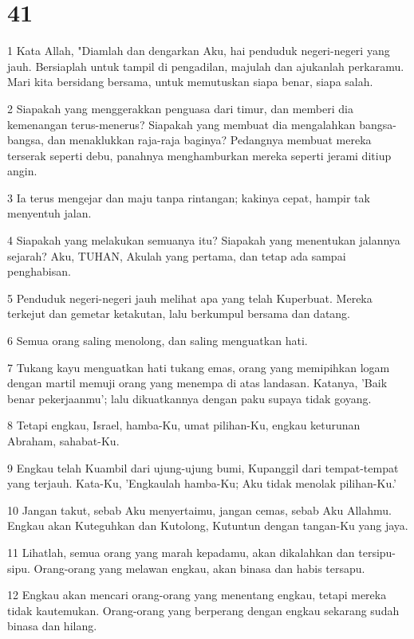 \chapter{41}

\par 1 Kata Allah, "Diamlah dan dengarkan Aku, hai penduduk negeri-negeri yang jauh. Bersiaplah untuk tampil di pengadilan, majulah dan ajukanlah perkaramu. Mari kita bersidang bersama, untuk memutuskan siapa benar, siapa salah.
\par 2 Siapakah yang menggerakkan penguasa dari timur, dan memberi dia kemenangan terus-menerus? Siapakah yang membuat dia mengalahkan bangsa-bangsa, dan menaklukkan raja-raja baginya? Pedangnya membuat mereka terserak seperti debu, panahnya menghamburkan mereka seperti jerami ditiup angin.
\par 3 Ia terus mengejar dan maju tanpa rintangan; kakinya cepat, hampir tak menyentuh jalan.
\par 4 Siapakah yang melakukan semuanya itu? Siapakah yang menentukan jalannya sejarah? Aku, TUHAN, Akulah yang pertama, dan tetap ada sampai penghabisan.
\par 5 Penduduk negeri-negeri jauh melihat apa yang telah Kuperbuat. Mereka terkejut dan gemetar ketakutan, lalu berkumpul bersama dan datang.
\par 6 Semua orang saling menolong, dan saling menguatkan hati.
\par 7 Tukang kayu menguatkan hati tukang emas, orang yang memipihkan logam dengan martil memuji orang yang menempa di atas landasan. Katanya, 'Baik benar pekerjaanmu'; lalu dikuatkannya dengan paku supaya tidak goyang.
\par 8 Tetapi engkau, Israel, hamba-Ku, umat pilihan-Ku, engkau keturunan Abraham, sahabat-Ku.
\par 9 Engkau telah Kuambil dari ujung-ujung bumi, Kupanggil dari tempat-tempat yang terjauh. Kata-Ku, 'Engkaulah hamba-Ku; Aku tidak menolak pilihan-Ku.'
\par 10 Jangan takut, sebab Aku menyertaimu, jangan cemas, sebab Aku Allahmu. Engkau akan Kuteguhkan dan Kutolong, Kutuntun dengan tangan-Ku yang jaya.
\par 11 Lihatlah, semua orang yang marah kepadamu, akan dikalahkan dan tersipu-sipu. Orang-orang yang melawan engkau, akan binasa dan habis tersapu.
\par 12 Engkau akan mencari orang-orang yang menentang engkau, tetapi mereka tidak kautemukan. Orang-orang yang berperang dengan engkau sekarang sudah binasa dan hilang.
